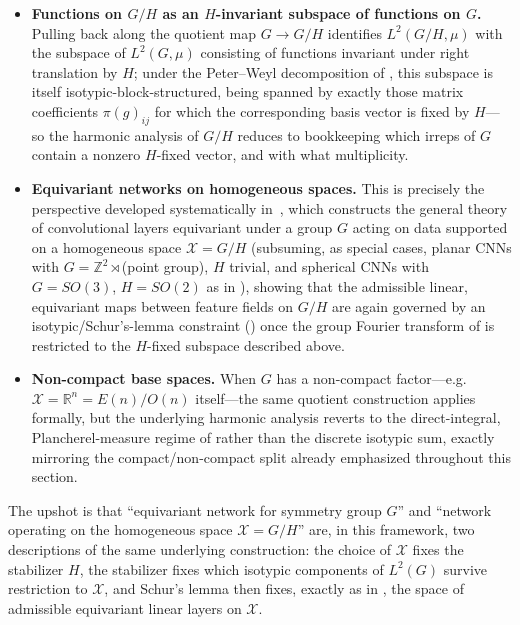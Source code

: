 \documentclass[11pt]{article}
\theoremstyle{plain}
\theoremstyle{definition}
\begin{document}
\begin{itemize}
    \item \textbf{Functions on $G/H$ as an $H$-invariant subspace of
    functions on $G$.} Pulling back along the quotient map $G \to G/H$
    identifies $L^2(G/H,\mu)$ with the subspace of $L^2(G,\mu)$ consisting
    of functions invariant under right translation by $H$; under the
    Peter--Weyl decomposition of
    , this subspace is itself
    isotypic-block-structured, being spanned by exactly those matrix
    coefficients $\pi(g)_{ij}$ for which the corresponding basis vector is
    fixed by $H$---so the harmonic analysis of $G/H$ reduces to bookkeeping
    which irreps of $G$ contain a nonzero $H$-fixed vector, and with what
    multiplicity.
    \item \textbf{Equivariant networks on homogeneous spaces.} This is
    precisely the perspective developed systematically
    in~\citet{cohen2019anips}, which constructs the general theory of
    convolutional layers equivariant under a group $G$ acting on data
    supported on a homogeneous space $\mathcal{X} = G/H$ (subsuming, as special cases,
    planar CNNs with $G = \mathbb{Z}^2 \rtimes$(point group), $H$ trivial,
    and spherical CNNs with $G = SO(3)$, $H = SO(2)$ as in
    ), showing that the admissible
    linear, equivariant maps between feature fields on $G/H$ are again
    governed by an isotypic/Schur's-lemma constraint
    () once the group Fourier transform
    of  is restricted to the
    $H$-fixed subspace described above.
    \item \textbf{Non-compact base spaces.} When $G$ has a non-compact
    factor---e.g.\ $\mathcal{X} = \mathbb{R}^n = E(n)/O(n)$ itself---the same
    quotient construction applies formally, but the underlying harmonic
    analysis reverts to the direct-integral, Plancherel-measure regime of
     rather than the discrete
    isotypic sum, exactly mirroring the compact/non-compact split already
    emphasized throughout this section.
\end{itemize}

The upshot is that ``equivariant network for symmetry group $G$'' and
``network operating on the homogeneous space $\mathcal{X} = G/H$'' are, in this
framework, two descriptions of the same underlying construction: the choice
of $\mathcal{X}$ fixes the stabilizer $H$, the stabilizer fixes which isotypic
components of $L^2(G)$ survive restriction to $\mathcal{X}$, and Schur's lemma then
fixes, exactly as in , the space of
admissible equivariant linear layers on $\mathcal{X}$.
\end{document}
